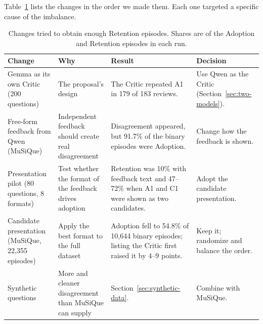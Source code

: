 Table~\ref{tab:balance-attempts} lists the changes in the order we made them.
Each one targeted a specific cause of the imbalance.

\begin{table}[htbp]
    \centering
    \caption{Changes tried to obtain enough Retention episodes. Shares are
    of the Adoption and Retention episodes in each run.}
    \label{tab:balance-attempts}
    \small
    \begin{tabular}{p{3.0cm}p{3.6cm}p{4.6cm}p{3.2cm}}
        \toprule
        Change & Why & Result & Decision \tabularnewline
        \midrule
        \raggedright Gemma as its own Critic (200 questions)
            & \raggedright The proposal's design
            & \raggedright The Critic repeated A1 in 179 of 183 reviews.
            & \raggedright Use Qwen as the Critic
              (Section~\ref{sec:two-models}). \tabularnewline
        \raggedright Free-form feedback from Qwen (MuSiQue)
            & \raggedright Independent feedback should create real
              disagreement
            & \raggedright Disagreement appeared, but 91.7\% of the binary
              episodes were Adoption.
            & \raggedright Change how the feedback is shown. \tabularnewline
        \raggedright Presentation pilot (80 questions, 8 formats)
            & \raggedright Test whether the format of the feedback drives
              adoption
            & \raggedright Retention was 10\% with feedback text and 47--72\%
              when A1 and C1 were shown as two candidates.
            & \raggedright Adopt the candidate presentation. \tabularnewline
        \raggedright Candidate presentation (MuSiQue, 22,355 episodes)
            & \raggedright Apply the best format to the full dataset
            & \raggedright Adoption fell to 54.8\% of 10,644 binary episodes;
              listing the Critic first raised it by 4--9 points.
            & \raggedright Keep it; randomize and balance the order.
              \tabularnewline
        \raggedright Synthetic questions
            & \raggedright More and cleaner disagreement than MuSiQue can
              supply
            & \raggedright Section~\ref{sec:synthetic-data}.
            & \raggedright Combine with MuSiQue. \tabularnewline
        \bottomrule
    \end{tabular}
\end{table}


